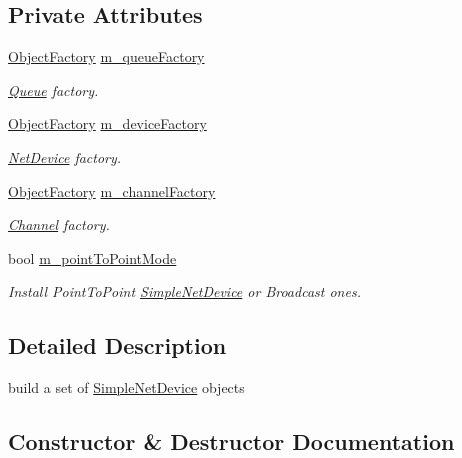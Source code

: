 \subsection*{Private Attributes}
\begin{DoxyCompactItemize}
\item 
\hyperlink{classns3_1_1ObjectFactory}{Object\+Factory} \hyperlink{classns3_1_1SimpleNetDeviceHelper_a418875bf03c8a15b617f4cdcb57f69ef}{m\+\_\+queue\+Factory}
\begin{DoxyCompactList}\small\item\em \hyperlink{classns3_1_1Queue}{Queue} factory. \end{DoxyCompactList}\item 
\hyperlink{classns3_1_1ObjectFactory}{Object\+Factory} \hyperlink{classns3_1_1SimpleNetDeviceHelper_a2555ba53ee4e238d63425937d196532f}{m\+\_\+device\+Factory}
\begin{DoxyCompactList}\small\item\em \hyperlink{classns3_1_1NetDevice}{Net\+Device} factory. \end{DoxyCompactList}\item 
\hyperlink{classns3_1_1ObjectFactory}{Object\+Factory} \hyperlink{classns3_1_1SimpleNetDeviceHelper_a341da0874ddd41d3f97243553d27f73e}{m\+\_\+channel\+Factory}
\begin{DoxyCompactList}\small\item\em \hyperlink{classns3_1_1Channel}{Channel} factory. \end{DoxyCompactList}\item 
bool \hyperlink{classns3_1_1SimpleNetDeviceHelper_ae12061387bb5a253a4f812a34e90d5a5}{m\+\_\+point\+To\+Point\+Mode}
\begin{DoxyCompactList}\small\item\em Install Point\+To\+Point \hyperlink{classns3_1_1SimpleNetDevice}{Simple\+Net\+Device} or Broadcast ones. \end{DoxyCompactList}\end{DoxyCompactItemize}


\subsection{Detailed Description}
build a set of \hyperlink{classns3_1_1SimpleNetDevice}{Simple\+Net\+Device} objects 

\subsection{Constructor \& Destructor Documentation}
